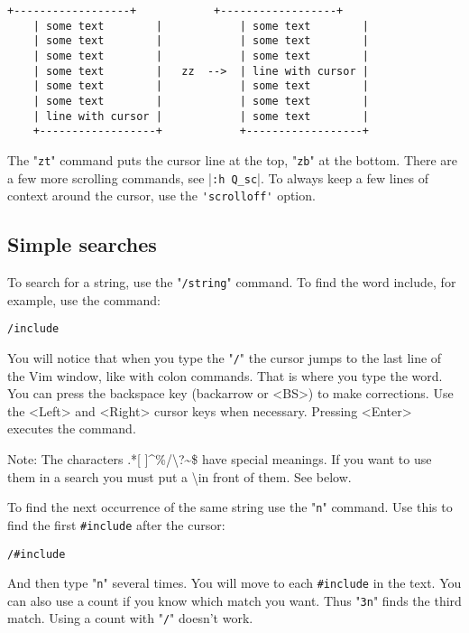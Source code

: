 \begin{Verbatim}[samepage=true]
    +------------------+            +------------------+
    | some text        |            | some text        |
    | some text        |            | some text        |
    | some text        |            | some text        |
    | some text        |   zz  -->  | line with cursor |
    | some text        |            | some text        |
    | some text        |            | some text        |
    | line with cursor |            | some text        |
    +------------------+            +------------------+
\end{Verbatim}

The "\verb!zt!" command puts the cursor line at the top, "\verb!zb!" at the bottom.
There are a few more scrolling commands, see |\verb!:h Q_sc!|.
To always keep a few lines of context around the cursor, use the \verb!'scrolloff'! option.

\subsection{Simple searches}

To search for a string, use the "\verb!/string!" command.
To find the word include, for example, use the command:

 \begin{Verbatim}[samepage=true]
 /include
 \end{Verbatim}

You will notice that when you type the "\verb!/!" the cursor jumps to the last line of the Vim window, like with colon commands.
That is where you type the word.
You can press the backspace key (backarrow or <BS>) to make corrections.
Use the <Left> and <Right> cursor keys when necessary.
Pressing <Enter> executes the command.

Note:
The characters .*[ ]\textasciicircum\%/\textbackslash?\textasciitilde\$ have special meanings.
If you want to use them in a search you must put a \textbackslash in front of them.
See below.

To find the next occurrence of the same string use the "\verb!n!" command.
Use this to find the first \verb!#include! after the cursor:

 \begin{Verbatim}[samepage=true]
 /#include
 \end{Verbatim}

And then type "\verb!n!" several times.
You will move to each \verb!#include! in the text.
You can also use a count if you know which match you want.
Thus "\verb!3n!" finds the third match.
Using a count with "\verb!/!" doesn't work.

